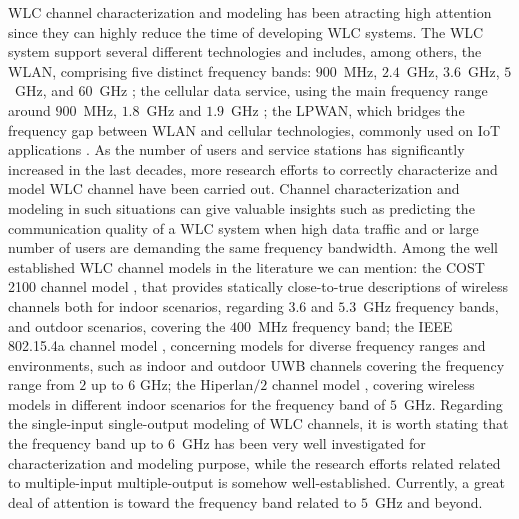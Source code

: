 \ac{WLC} channel characterization and modeling has been atracting high attention since they can highly reduce the time of developing \ac{WLC} systems. The \ac{WLC} system support several different technologies and includes, among others, the \ac{WLAN}, comprising five distinct frequency bands: $900$~MHz, $2.4$~GHz, $3.6$~GHz, $5$~GHz, and $60$~GHz \cite{IEEEWI}; the cellular data service, using the main frequency range around $900$~MHz, $1.8$~GHz and $1.9$~GHz \cite{GSM}; the \ac{LPWAN}, which bridges the frequency gap between \ac{WLAN} and cellular technologies, commonly used on \ac{IoT} applications \cite{Patel}. As the number of users and service stations has significantly increased in the last decades, more research efforts to correctly characterize and model \ac{WLC} channel have been carried out. Channel characterization and modeling in such situations can give valuable insights such as predicting the communication quality of a \ac{WLC} system when high data traffic and or large number of users are demanding the same frequency bandwidth. Among the well established \ac{WLC} channel models in the literature we can mention: the COST 2100 channel model \cite{COST}, that provides statically close-to-true descriptions of wireless channels both for indoor scenarios, regarding $3.6$ and $5.3$~GHz frequency bands, and outdoor scenarios, covering the $400$~MHz frequency band; the IEEE 802.15.4a channel model \cite{802.15}, concerning models for diverse frequency ranges and environments, such as indoor and outdoor \ac{UWB} channels covering the frequency range from $2$ up to $6$ GHz; the Hiperlan$/2$ channel model \cite{Hiperlan2}, covering wireless models in different indoor scenarios for the frequency band of $5$~GHz. Regarding the single-input single-output modeling of \ac{WLC} channels, it is worth stating that the frequency band up to $6$~GHz has been very well investigated for characterization and modeling purpose, while the research efforts related related to multiple-input multiple-output is somehow well-established. Currently, a great deal of attention is toward the frequency band related to $5$~GHz and beyond.


